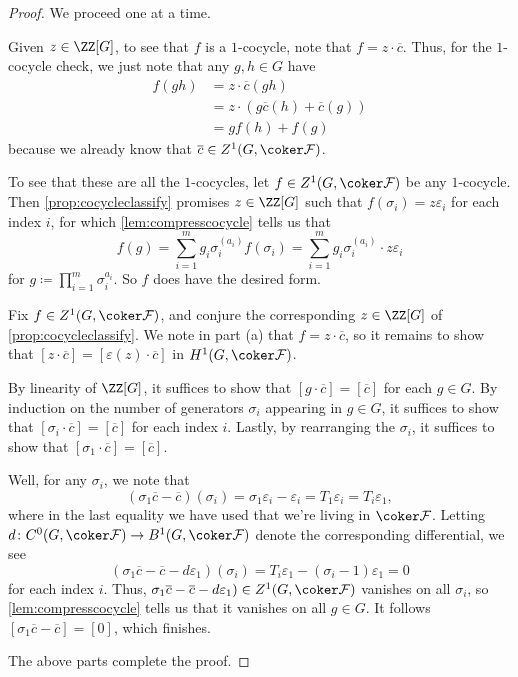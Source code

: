 \documentclass{article}
\numberwithin{equation}{section}
\begin{document}
\begin{proof}
	We proceed one at a time.
	\begin{listalph}
		\item Given $z\in\ZZ[G]$, to see that $f$ is a $1$-cocycle, note that $f=z\cdot\overline c$. Thus, for the $1$-cocycle check, we just note that any $g,h\in G$ have
		\begin{align*}
			f(gh) &= z\cdot\overline c(gh) \\
			&= z\cdot(g\overline c(h)+\overline c(g)) \\
			&= gf(h)+f(g)
		\end{align*}
		because we already know that $\overline c\in Z^1(G,\coker\mathcal F)$.

		To see that these are all the $1$-cocycles, let $f\in Z^1(G,\coker\mathcal F)$ be any $1$-cocycle. Then \autoref{prop:cocycleclassify} promises $z\in\ZZ[G]$ such that $f(\sigma_i)=z\varepsilon_i$ for each index $i$, for which \autoref{lem:compresscocycle} tells us that
		\[f(g)=\sum_{i=1}^mg_i\sigma_i^{(a_i)}f(\sigma_i)=\sum_{i=1}^mg_i\sigma_i^{(a_i)}\cdot z\varepsilon_i\]
		for $g\coloneqq\prod_{i=1}^m\sigma_i^{a_i}$. So $f$ does have the desired form.

		\item Fix $f\in Z^1(G,\coker\mathcal F)$, and conjure the corresponding $z\in\ZZ[G]$ of \autoref{prop:cocycleclassify}. We note in part (a) that $f=z\cdot\overline c$, so it remains to show that $[z\cdot\overline c]=[\varepsilon(z)\cdot\overline c]$ in $H^1(G,\coker\mathcal F)$.
		
		By linearity of $\ZZ[G]$, it suffices to show that $[g\cdot\overline c]=[\overline c]$ for each $g\in G$. By induction on the number of generators $\sigma_i$ appearing in $g\in G$, it suffices to show that $[\sigma_i\cdot\overline c]=[\overline c]$ for each index $i$. Lastly, by rearranging the $\sigma_i$, it suffices to show that $[\sigma_1\cdot\overline c]=[\overline c]$.

		Well, for any $\sigma_i$, we note that
		\[(\sigma_1\overline c-\overline c)(\sigma_i)=\sigma_1\varepsilon_i-\varepsilon_i=T_1\varepsilon_i=T_i\varepsilon_1,\]
		where in the last equality we have used that we're living in $\coker\mathcal F$. Letting $d\colon C^0(G,\coker\mathcal F)\to B^1(G,\coker\mathcal F)$ denote the corresponding differential, we see
		\[(\sigma_1\overline c-\overline c-d\varepsilon_1)(\sigma_i)=T_i\varepsilon_1-(\sigma_i-1)\varepsilon_1=0\]
		for each index $i$. Thus, $\sigma_1\overline c-\overline c-d\varepsilon_1)\in Z^1(G,\coker\mathcal F)$ vanishes on all $\sigma_i$, so \autoref{lem:compresscocycle} tells us that it vanishes on all $g\in G$. It follows $[\sigma_1\overline c-\overline c]=[0]$, which finishes.
	\end{listalph}
	The above parts complete the proof.
\end{proof}
\end{document}
